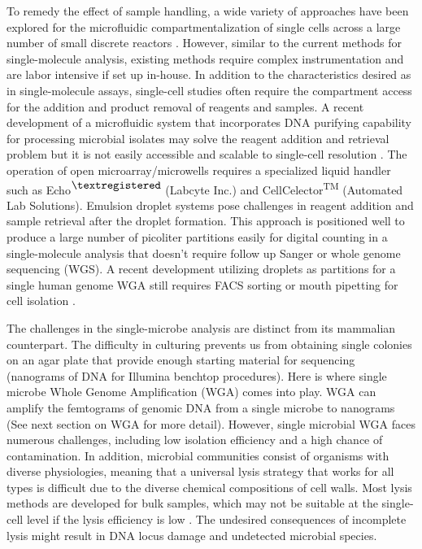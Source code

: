 To remedy the effect of sample handling, a wide variety of approaches have been explored for the microfluidic compartmentalization of single cells across a large number of small discrete reactors \cite{deBourcy:2014ji,Marcy:2007ip}. However, similar to the current methods for single-molecule analysis, existing methods require complex instrumentation and are labor intensive if set up in-house. In addition to the characteristics desired as in single-molecule assays, single-cell studies often require the compartment access for the addition and product removal of reagents and samples. A recent development of a microfluidic system that incorporates DNA purifying capability for processing microbial isolates may solve the reagent addition and retrieval problem but it is not easily accessible and scalable to single-cell resolution \cite{Kim:2017gy}. The operation of open microarray/microwells requires a specialized liquid handler such as Echo\textsuperscript{$\textregistered$} (Labcyte Inc.) and CellCelector\textsuperscript{TM} (Automated Lab Solutions). Emulsion droplet systems pose challenges in reagent addition and sample retrieval after the droplet formation. This approach is positioned well to produce a large number of picoliter partitions easily for digital counting in a single-molecule analysis that doesn't require follow up Sanger or whole genome sequencing (WGS). A recent development utilizing droplets as partitions for a single human genome WGA still requires FACS sorting or mouth pipetting for cell isolation \cite{Fu:2015gl}. 

The challenges in the single-microbe analysis are distinct from its mammalian counterpart. The difficulty in culturing prevents us from obtaining single colonies on an agar plate that provide enough starting material for sequencing (nanograms of DNA for Illumina benchtop procedures). Here is where single microbe Whole Genome Amplification (WGA) comes into play. WGA can amplify the femtograms of genomic DNA from a single microbe to nanograms (See next section on WGA for more detail). However, single microbial WGA faces numerous challenges, including low isolation efficiency and a high chance of contamination. In addition, microbial communities consist of organisms with diverse physiologies, meaning that a universal lysis strategy that works for all types is difficult due to the diverse chemical compositions of cell walls. Most lysis methods are developed for bulk samples, which may not be suitable at the single-cell level if the lysis efficiency is low \cite{Blainey:2013dp}. The undesired consequences of incomplete lysis might result in DNA locus damage and undetected microbial species. 

